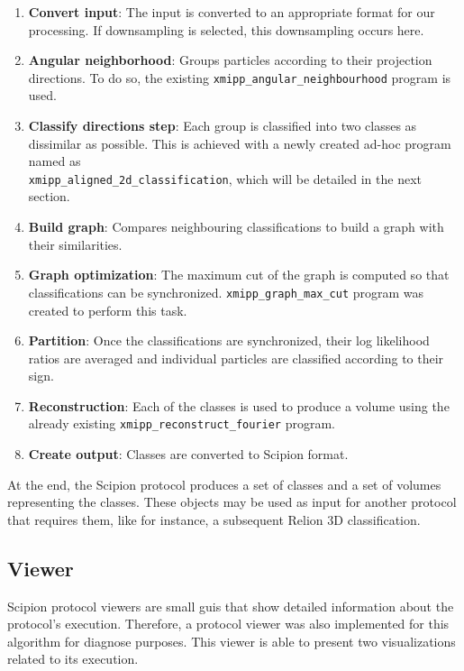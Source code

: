 \documentclass[../main.tex]{subfiles}
\begin{document}
\begin{enumerate}
    \item \textbf{Convert input}: The input is converted to an appropriate format for our processing. If downsampling is selected, this downsampling occurs here.
    \item \textbf{Angular neighborhood}: Groups particles according to their projection directions. To do so, the existing \texttt{xmipp\_angular\_neighbourhood} program is used.
    \item \textbf{Classify directions step}: Each group is classified into two classes as dissimilar as possible. This is achieved with a newly created ad-hoc program named as\\ \texttt{xmipp\_aligned\_2d\_classification}, which will be detailed in the next section. 
    \item \textbf{Build graph}: Compares neighbouring classifications to build a graph with their similarities.
    \item \textbf{Graph optimization}: The maximum cut of the graph is computed so that classifications can be synchronized. \texttt{xmipp\_graph\_max\_cut} program was created to perform this task. 
    \item \textbf{Partition}: Once the classifications are synchronized, their log likelihood ratios are averaged and individual particles are classified according to their sign.
    \item \textbf{Reconstruction}: Each of the classes is used to produce a volume using the already existing \texttt{xmipp\_reconstruct\_fourier} program.
    \item \textbf{Create output}: Classes are converted to Scipion format.
\end{enumerate}

At the end, the Scipion protocol produces a set of classes and a set of volumes representing the classes. These objects may be used as input for another protocol that requires them, like for instance, a subsequent Relion 3D classification.

\subsection{Viewer}
Scipion protocol viewers are small \glspl{gui} that show detailed information about the protocol's execution. Therefore, a protocol viewer was also implemented for this algorithm for diagnose purposes. This viewer is able to present two visualizations related to its execution. 
\end{document}
